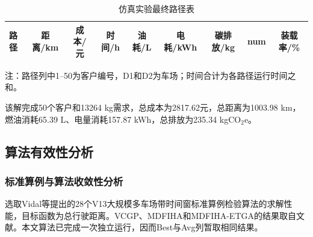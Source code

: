 \documentclass{setp-new}
\newcommand{\setptabsetup}{\small\renewcommand{\arraystretch}{0.95}\setlength{\tabcolsep}{2.2pt}\hbadness=10000}
\begin{document}
\begin{table}[H]
\centering
\caption{仿真实验最终路径表}
\label{tab:final-solution}
\setptabsetup
\begin{tabular*}{\textwidth}{@{\extracolsep{\fill}}lrrrrrrrr@{}}
\toprule
路径 & \multicolumn{1}{c}{距离/km} & \multicolumn{1}{c}{成本/元} & \multicolumn{1}{c}{时间/h} & \multicolumn{1}{c}{油耗/L} & \multicolumn{1}{c}{电耗/kWh} & \multicolumn{1}{c}{碳排放/kg} & \multicolumn{1}{c}{num} & \multicolumn{1}{c}{装载率/\%}\\
\midrule

\end{tabular*}
\vspace{1pt}
\parbox{\textwidth}{\footnotesize 注：路径列中1--50为客户编号，D1和D2为车场；时间合计为各路径运行时间之和。}
\end{table}

该解完成50个客户和13264 kg需求，总成本为2817.62元，总距离为1003.98 km，
燃油消耗65.39 L、电量消耗157.87 kWh，总排放为235.34 kgCO$_2$e。

\subsection{算法有效性分析}

\subsubsection{标准算例与算法收敛性分析}

选取Vidal等提出的28个V13大规模多车场带时间窗标准算例检验算法的求解性能，目标函数为总行驶距离。VCGP、MDFIHA和MDFIHA-ETGA的结果取自文献。本文算法已完成一次独立运行，因而Best与Avg列暂取相同结果。
\end{document}
